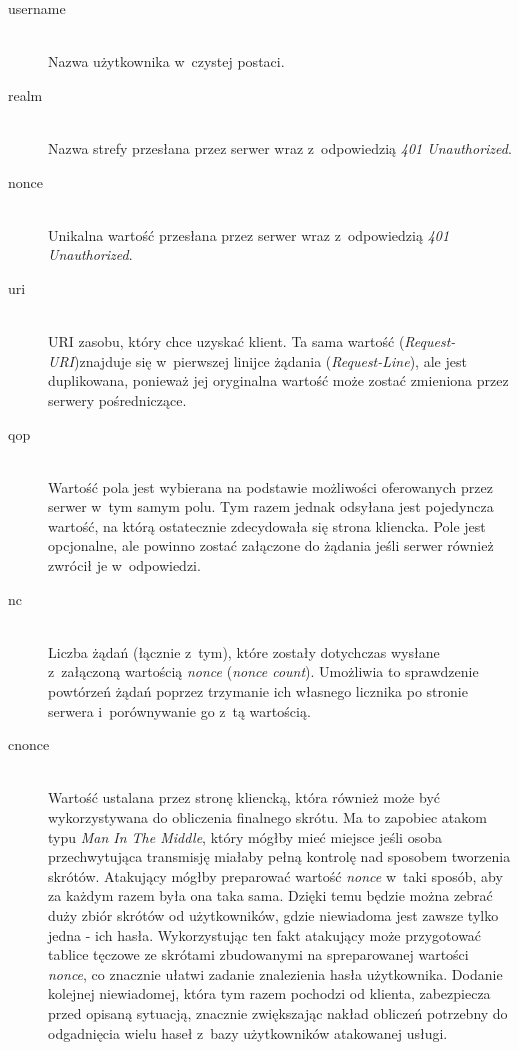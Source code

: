 \documentclass[11pt]{aghdpl}
\begin{document}
\begin{description}
\item[username] \hfill \\
Nazwa użytkownika w~czystej postaci.
\item[realm] \hfill \\
Nazwa strefy przesłana przez serwer wraz z~odpowiedzią \emph{401 Unauthorized}.
\item[nonce] \hfill \\
Unikalna wartość przesłana przez serwer wraz z~odpowiedzią \emph{401 Unauthorized}.
\item[uri] \hfill \\
URI zasobu, który chce uzyskać klient. Ta sama wartość (\emph{Request-URI})znajduje się w~pierwszej linijce żądania (\emph{Request-Line}), ale jest duplikowana, ponieważ jej oryginalna wartość może zostać zmieniona przez serwery pośredniczące.
\item[qop] \hfill \\
Wartość pola jest wybierana na podstawie możliwości oferowanych przez serwer w~tym samym polu. Tym razem jednak odsyłana jest pojedyncza wartość, na którą ostatecznie zdecydowała się strona kliencka. Pole jest opcjonalne, ale powinno zostać załączone do żądania jeśli serwer również zwrócił je w~odpowiedzi.
\item[nc] \hfill \\
Liczba żądań (łącznie z~tym), które zostały dotychczas wysłane z~załączoną wartością \emph{nonce} (\emph{nonce count}). Umożliwia to sprawdzenie powtórzeń żądań poprzez trzymanie ich własnego licznika po stronie serwera i~porównywanie go z~tą wartością.
\item[cnonce] \hfill \\
Wartość ustalana przez stronę kliencką, która również może być wykorzystywana do obliczenia finalnego skrótu. Ma to zapobiec atakom typu \emph{Man In The Middle}, który mógłby mieć miejsce jeśli osoba przechwytująca transmisję miałaby pełną kontrolę nad sposobem tworzenia skrótów. Atakujący mógłby preparować wartość \emph{nonce} w~taki sposób, aby za każdym razem była ona taka sama. Dzięki temu będzie można zebrać duży zbiór skrótów od użytkowników, gdzie niewiadoma jest zawsze tylko jedna - ich hasła. Wykorzystując ten fakt atakujący może przygotować tablice tęczowe ze skrótami zbudowanymi na spreparowanej wartości \emph{nonce}, co znacznie ułatwi zadanie znalezienia hasła użytkownika. Dodanie kolejnej niewiadomej, która tym razem pochodzi od klienta, zabezpiecza przed opisaną sytuacją, znacznie zwiększając nakład obliczeń potrzebny do odgadnięcia wielu haseł z~bazy użytkowników atakowanej usługi.

\end{description}
\end{document}
